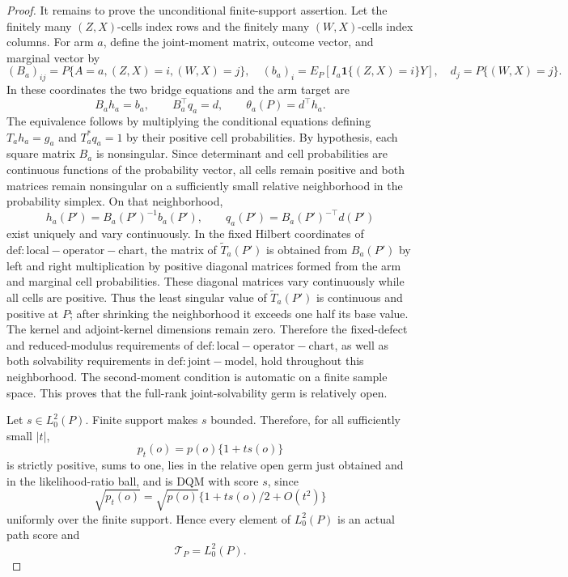 \documentclass{article}
\begin{document}
\begin{proof}
It remains to prove the unconditional finite-support assertion.  Let the finitely many \((Z,X)\)-cells index rows and the finitely many \((W,X)\)-cells index columns.  For arm \(a\), define the joint-moment matrix, outcome vector, and marginal vector by
\[
 (B_a)_{ij}=P\{A=a,(Z,X)=i,(W,X)=j\},\quad
 (b_a)_i=E_P[I_a\mathbf 1\{(Z,X)=i\}Y],\quad
 d_j=P\{(W,X)=j\}.                                                  \tag{17}
\]
In these coordinates the two bridge equations and the arm target are
\[
 B_ah_a=b_a,
 \qquad B_a^\top q_a=d,
 \qquad \theta_a(P)=d^\top h_a.                                   \tag{18}
\]
The equivalence follows by multiplying the conditional equations defining \(T_a h_a=g_a\) and \(T_a^*q_a=1\) by their positive cell probabilities.  By hypothesis, each square matrix \(B_a\) is nonsingular.  Since determinant and cell probabilities are continuous functions of the probability vector, all cells remain positive and both matrices remain nonsingular on a sufficiently small relative neighborhood in the probability simplex.  On that neighborhood,
\[
 h_a(P')=B_a(P')^{-1}b_a(P'),
 \qquad q_a(P')=B_a(P')^{-\top}d(P')                               \tag{19}
\]
exist uniquely and vary continuously.  In the fixed Hilbert coordinates of \(\mathrm{def:local-operator-chart}\), the matrix of \(\widetilde T_a(P')\) is obtained from \(B_a(P')\) by left and right multiplication by positive diagonal matrices formed from the arm and marginal cell probabilities.  These diagonal matrices vary continuously while all cells are positive.  Thus the least singular value of \(\widetilde T_a(P')\) is continuous and positive at \(P\); after shrinking the neighborhood it exceeds one half its base value.  The kernel and adjoint-kernel dimensions remain zero.  Therefore the fixed-defect and reduced-modulus requirements of \(\mathrm{def:local-operator-chart}\), as well as both solvability requirements in \(\mathrm{def:joint-model}\), hold throughout this neighborhood.  The second-moment condition is automatic on a finite sample space.  This proves that the full-rank joint-solvability germ is relatively open.

Let \(s\in L_0^2(P)\).  Finite support makes \(s\) bounded.  Therefore, for all sufficiently small \(|t|\),
\[
 p_t(o)=p(o)\{1+ts(o)\}                                            \tag{20}
\]
is strictly positive, sums to one, lies in the relative open germ just obtained and in the likelihood-ratio ball, and is DQM with score \(s\), since
\[
 \sqrt{p_t(o)}=\sqrt{p(o)}\{1+ts(o)/2+O(t^2)\}
\]
uniformly over the finite support.  Hence every element of \(L_0^2(P)\) is an actual path score and
\[
 \mathcal T_P=L_0^2(P).                                             \tag{21}
\]


\end{proof}
\end{document}
